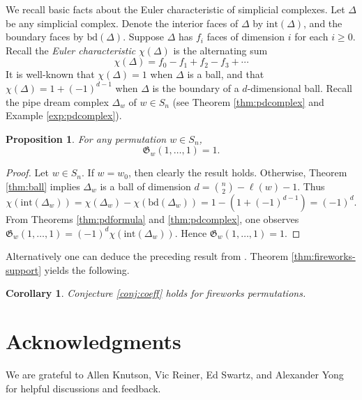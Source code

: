 \documentclass{amsart}
\newtheorem{proposition}[theorem]{Proposition}
\newtheorem{corollary}[theorem]{Corollary}
\theoremstyle{definition}
\theoremstyle{named}
\begin{document}
	
	We recall basic facts about the Euler characteristic of simplicial complexes. Let $\Delta$ be any simplicial complex. Denote the interior faces of $\Delta$ by $\mathrm{int}(\Delta)$, and the boundary faces by $\mathrm{bd}(\Delta)$. Suppose $\Delta$ has $f_i$ faces of dimension $i$ for each $i\geq 0$. Recall the \emph{Euler characteristic} $\chi(\Delta)$ is the alternating sum
	\[\chi(\Delta) = f_0-f_1+f_2-f_3+\cdots \]
	It is well-known that $\chi(\Delta)=1$ when $\Delta$ is a ball, and that $\chi(\Delta)=1+(-1)^{d-1}$ when $\Delta$ is the boundary of a $d$-dimensional ball. Recall the pipe dream complex $\Delta_w$ of $w\in S_n$ (see Theorem \ref{thm:pdcomplex} and Example \ref{exp:pdcomplex}).
	
	\begin{proposition}
		\label{prop:grothprinspec}
		For any permutation $w\in S_n$, 
		\[\mathfrak{G}_w(1,\ldots, 1) = 1.\]
	\end{proposition}
	\begin{proof}
		Let $w\in S_n$. If $w=w_0$, then clearly the result holds. Otherwise, Theorem \ref{thm:ball} implies $\Delta_w$ is a ball of dimension $d=\binom{n}{2}-\ell(w)-1$. Thus
		\[\chi(\mathrm{int}(\Delta_w)) = \chi(\Delta_w) - \chi(\mathrm{bd}(\Delta_w)) = 1-(1+(-1)^{d-1}) = (-1)^d. \]
		From Theorems \ref{thm:pdformula} and \ref{thm:pdcomplex}, one observes $\mathfrak{G}_w(1,\ldots,1) = (-1)^d\chi(\mathrm{int}(\Delta_w))$. Hence $\mathfrak{G}_w(1,\ldots,1) = 1.$
	\end{proof}
	Alternatively one can deduce the preceding result from \cite[Lemma 2.3]{belong}. Theorem \ref{thm:fireworks-support} yields the following.
	
	\begin{corollary}
		Conjecture \ref{conj:coeff} holds for fireworks permutations.
	\end{corollary}
	
	\section*{Acknowledgments} 
	We are grateful to Allen Knutson, Vic Reiner, Ed Swartz, and Alexander Yong for helpful discussions and feedback.
	
	
	
\end{document}
